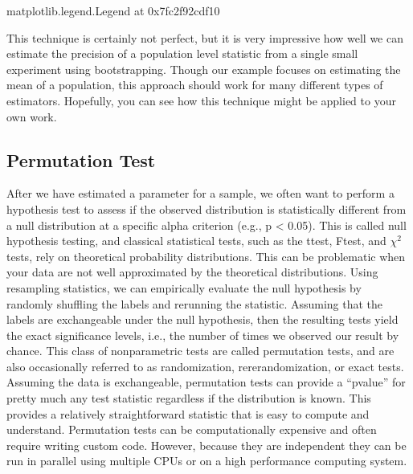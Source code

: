 \documentclass[letterpaper,10pt,english]{sphinxmanual}
\begin{document}
\begin{sphinxVerbatim}[commandchars=\\\{\}]
\PYGZlt{}matplotlib.legend.Legend at 0x7fc2f92cdf10\PYGZgt{}
\end{sphinxVerbatim}

\noindent{}

This technique is certainly not perfect, but it is very impressive how well we can estimate the precision of a population level statistic from a single small experiment using bootstrapping. Though our example focuses on estimating the mean of a population, this approach should work for many different types of estimators. Hopefully, you can see how this technique might be applied to your own work.


\subsection{Permutation Test}
\label{\detokenize{content/Resampling_Statistics:permutation-test}}
After we have estimated a parameter for a sample, we often want to perform a hypothesis test to assess if the observed distribution is statistically different from a null distribution at a specific alpha criterion (e.g., p \textless{} 0.05). This is called null hypothesis testing, and classical statistical tests, such as the t\sphinxhyphen{}test, F\sphinxhyphen{}test, and \(\chi^2\) tests, rely on theoretical probability distributions. This can be problematic when your data are not well approximated by the theoretical distributions. Using resampling statistics, we can empirically evaluate the null hypothesis by randomly shuffling the labels and re\sphinxhyphen{}running the statistic. Assuming that the labels are exchangeable under the null hypothesis, then the resulting tests yield the exact significance levels, i.e., the number of times we observed our result by chance. This class of non\sphinxhyphen{}parametric tests are called permutation tests, and are also occasionally referred to as randomization, re\sphinxhyphen{}rerandomization, or exact tests. Assuming the data is exchangeable, permutation tests can provide a “p\sphinxhyphen{}value” for pretty much any test statistic regardless if the distribution is known. This provides a relatively straightforward statistic that is easy to compute and understand. Permutation tests can be computationally expensive and often require writing custom code. However, because they are independent they can be run in parallel using multiple CPUs or on a high performance computing system.
\end{document}
